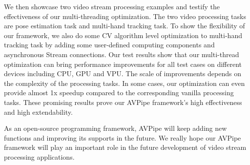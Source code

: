 \begin{bigabstract}
We then showcase two video stream processing examples and testify the effectiveness of our multi-threading optimization. The two video processing tasks are pose estimation task and multi-hand tracking task. To show the flexibility of our framework, we also do some CV algorithm level optimization to multi-hand tracking task by adding some user-defined computing components and asynchronous Stream connections. Our test results show that our multi-thread optimization can bring performance improvements for all test cases on different devices including CPU, GPU and VPU. The scale of improvements depends on the complexity of the processing tasks. In some cases, our optimization can even provide almost 1x speedup compared to the corresponding vanilla processing tasks. These promising results prove our AVPipe framework's high effectiveness and high extendability.

As an open-source programming framework, AVPipe will keep adding new functions and improving its supports in the future. We really hope our AVPipe framework will play an important role in the future development of video stream processing applications.

\end{bigabstract}
